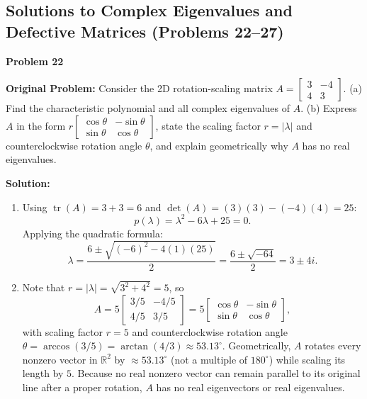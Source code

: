\documentclass[11pt, letterpaper]{article}
\theoremstyle{definition}
\theoremstyle{remark}
\begin{document}
\subsection{Solutions to Complex Eigenvalues and Defective Matrices (Problems 22--27)}

\noindent\textbf{Problem 22}

\textbf{Original Problem:} Consider the 2D rotation-scaling matrix $A = \begin{bmatrix} 3 & -4 \\ 4 & 3 \end{bmatrix}$. (a) Find the characteristic polynomial and all complex eigenvalues of $A$. (b) Express $A$ in the form $r \begin{bmatrix} \cos\theta & -\sin\theta \\ \sin\theta & \cos\theta \end{bmatrix}$, state the scaling factor $r = |\lambda|$ and counterclockwise rotation angle $\theta$, and explain geometrically why $A$ has no real eigenvalues.

\textbf{Solution:}
\begin{enumerate}[label=(\alph*), topsep=3pt, itemsep=4pt]
    \item Using $\operatorname{tr}(A) = 3 + 3 = 6$ and $\det(A) = (3)(3) - (-4)(4) = 25$:
    \[
    p(\lambda) = \lambda^2 - 6\lambda + 25 = 0.
    \]
    Applying the quadratic formula:
    \[
    \lambda = \frac{6 \pm \sqrt{(-6)^2 - 4(1)(25)}}{2} = \frac{6 \pm \sqrt{-64}}{2} = 3 \pm 4i.
    \]
    \item Note that $r = |\lambda| = \sqrt{3^2 + 4^2} = 5$, so
    \[
    A = 5\begin{bmatrix} 3/5 & -4/5 \\ 4/5 & 3/5 \end{bmatrix} = 5\begin{bmatrix} \cos\theta & -\sin\theta \\ \sin\theta & \cos\theta \end{bmatrix},
    \]
    with scaling factor $r = 5$ and counterclockwise rotation angle $\theta = \arccos(3/5) = \arctan(4/3) \approx 53.13^\circ$. Geometrically, $A$ rotates every nonzero vector in $\mathbb{R}^2$ by $\approx 53.13^\circ$ (not a multiple of $180^\circ$) while scaling its length by $5$. Because no real nonzero vector can remain parallel to its original line after a proper rotation, $A$ has no real eigenvectors or real eigenvalues.
\end{enumerate}
\end{document}
